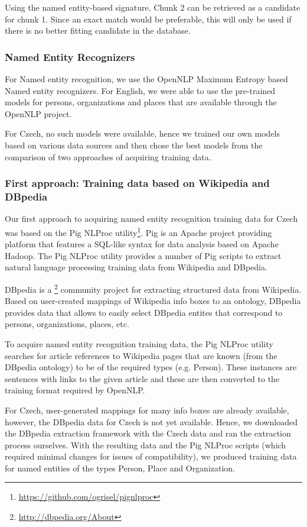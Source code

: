Using the named entity-based signature, Chunk 2 can be retrieved as a
candidate for chunk 1. Since an exact match would be preferable, this 
will only be used if there is no better fitting candidate in the
database.

\subsubsection{Named Entity Recognizers}

For Named entity recognition, we use the OpenNLP Maximum Entropy based
Named entity recognizers. For English, we were able to use the pre-trained
models for persons, organizations and places that are available through the
OpenNLP project.

For Czech, no such models were available, hence we trained our own models based
on various data sources and then chose the best models from the comparison 
of two approaches of acquiring training data.


\subsubsection*{First approach: Training data based on Wikipedia and DBpedia}

Our first approach to acquiring named entity recognition training data for Czech 
was based on the Pig NLProc utility\footnote{\url{https://github.com/ogrisel/pignlproc}}.
Pig is an Apache project providing platform that features a SQL-like syntax
for data analysis based on Apache Hadoop. The Pig NLProc utility provides a number
of Pig scripts to extract natural language processing training data from Wikipedia
and DBpedia.

DBpedia is a \footnote{\url{http://dbpedia.org/About}} community project for extracting 
structured data from Wikipedia. Based on user-created mappings of Wikipedia info boxes to
an ontology, DBpedia provides data that allows to easily select DBpedia entites that 
correspond to persons, organizations, places, etc.

To acquire named entity recognition training data, the Pig NLProc utility searches
for article references to Wikipedia pages that are known (from the DBpedia ontology)
to be of the required types (e.g. Person). These instances are sentences with links
to the given article and these are then converted to the training format required 
by OpenNLP.

For Czech, user-generated mappings for many info boxes are already available, however,
the DBpedia data for Czech is not yet available. Hence, we downloaded the DBpedia
extraction framework with the Czech data and ran the extraction process ourselves.
With the resulting data and the Pig NLProc scripts (which required minimal changes
for issues of compatibility), we produced training data for named entities of the types
Person, Place and Organization.



